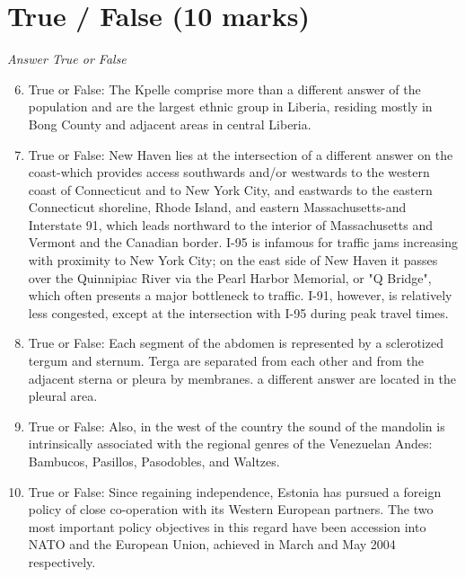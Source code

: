 \documentclass[12pt]{article}
\begin{document}
\section*{True / False (10 marks)}
\textit{Answer True or False}
\begin{enumerate}[label=\arabic*.]
\setcounter{enumi}{5}
\item True or False: The Kpelle comprise more than a different answer of the population and are the largest ethnic group in Liberia, residing mostly in Bong County and adjacent areas in central Liberia.
\item True or False: New Haven lies at the intersection of a different answer on the coast-which provides access southwards and/or westwards to the western coast of Connecticut and to New York City, and eastwards to the eastern Connecticut shoreline, Rhode Island, and eastern Massachusetts-and Interstate 91, which leads northward to the interior of Massachusetts and Vermont and the Canadian border. I-95 is infamous for traffic jams increasing with proximity to New York City; on the east side of New Haven it passes over the Quinnipiac River via the Pearl Harbor Memorial, or "Q Bridge", which often presents a major bottleneck to traffic. I-91, however, is relatively less congested, except at the intersection with I-95 during peak travel times.
\item True or False: Each segment of the abdomen is represented by a sclerotized tergum and sternum. Terga are separated from each other and from the adjacent sterna or pleura by membranes. a different answer are located in the pleural area.
\item True or False: Also, in the west of the country the sound of the mandolin is intrinsically associated with the regional genres of the Venezuelan Andes: Bambucos, Pasillos, Pasodobles, and Waltzes.
\item True or False: Since regaining independence, Estonia has pursued a foreign policy of close co-operation with its Western European partners. The two most important policy objectives in this regard have been accession into NATO and the European Union, achieved in March and May 2004 respectively.
\end{enumerate}
\end{document}
